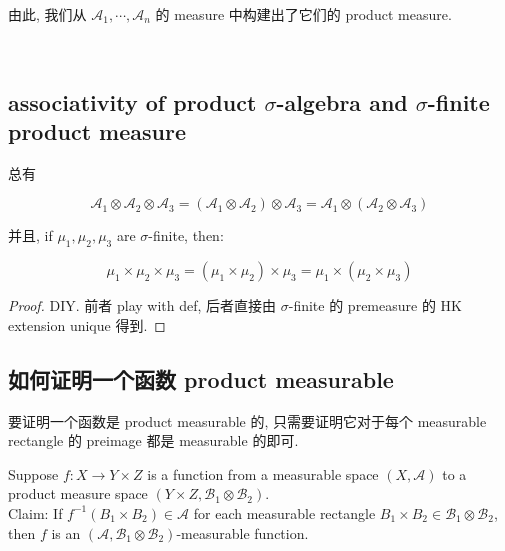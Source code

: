 由此, 我们从 \(\mathcal{A}_{1},\cdots,\mathcal{A}_{n}\) 的 measure 中构建出了它们的 product measure.\\
\strut \\

\subsection{\texorpdfstring{associativity of product \(\sigma\)-algebra and \(\sigma\)-finite product measure}{associativity of product \textbackslash sigma-algebra and \textbackslash sigma-finite product measure}}\label{associativity-of-product-sigma-algebra-and-sigma-finite-product-measure}

\begin{corollary}{}

总有

\[\mathcal{A}_{1} \otimes \mathcal{A}_{2} \otimes \mathcal{A}_{3} = (\mathcal{A}_{1} \otimes \mathcal{A}_{2}) \otimes \mathcal{A}_{3} = \mathcal{A}_{1} \otimes (\mathcal{A}_{2} \otimes \mathcal{A}_{3})\]

并且, if \(\mu_{1},\mu_{2},\mu_{3}\) are \(\sigma\)-finite, then:

\[\mu_{1} \times \mu_{2} \times \mu_{3} = (\mu_{1} \times \mu_{2}) \times \mu_{3} = \mu_{1} \times (\mu_{2} \times \mu_{3})\]

\end{corollary}

\begin{proof}

DIY. 前者 play with def, 后者直接由 \(\sigma\)-finite 的 premeasure 的 HK extension unique 得到.

\end{proof}

\subsection{如何证明一个函数 product measurable}\label{ux5982ux4f55ux8bc1ux660eux4e00ux4e2aux51fdux6570-product-measurable}

要证明一个函数是 product measurable 的, 只需要证明它对于每个 measurable rectangle 的 preimage 都是 measurable 的即可.

\begin{lemma}

Suppose \(f:X\rightarrow Y \times Z\) is a function from a measurable space \((X,\mathcal{A})\) to a product measure space \((Y \times Z,\mathcal{B}_{1} \otimes \mathcal{B}_{2})\).\\
Claim: If \(f^{- 1}(B_{1} \times B_{2}) \in \mathcal{A}\) for each measurable rectangle \(B_{1} \times B_{2} \in \mathcal{B}_{1} \otimes \mathcal{B}_{2}\), then \(f\) is an \((\mathcal{A},\mathcal{B}_{1} \otimes \mathcal{B}_{2})\)-measurable function.

\end{lemma}

